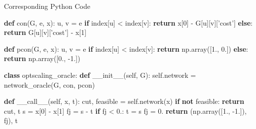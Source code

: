 \documentclass[10pt,ignorenonframetext,serif,onlymath]{beamer}
\newenvironment{Shaded}{}{}
\newcommand{\ControlFlowTok}[1]{\textcolor[rgb]{0.00,0.44,0.13}{\textbf{#1}}}
\newcommand{\DecValTok}[1]{\textcolor[rgb]{0.25,0.63,0.44}{#1}}
\newcommand{\FloatTok}[1]{\textcolor[rgb]{0.25,0.63,0.44}{#1}}
\newcommand{\FunctionTok}[1]{\textcolor[rgb]{0.02,0.16,0.49}{#1}}
\newcommand{\KeywordTok}[1]{\textcolor[rgb]{0.00,0.44,0.13}{\textbf{#1}}}
\newcommand{\NormalTok}[1]{#1}
\newcommand{\OperatorTok}[1]{\textcolor[rgb]{0.40,0.40,0.40}{#1}}
\newcommand{\StringTok}[1]{\textcolor[rgb]{0.25,0.44,0.63}{#1}}
\newcommand{\VariableTok}[1]{\textcolor[rgb]{0.10,0.09,0.49}{#1}}
\begin{document}
\begin{frame}[fragile]{Corresponding Python Code}
\protect\hypertarget{corresponding-python-code-3}{}

\scriptsize

\begin{Shaded}
\begin{Highlighting}[]
\KeywordTok{def}\NormalTok{ con(G, e, x):}
\NormalTok{    u, v }\OperatorTok{=}\NormalTok{ e}
    \ControlFlowTok{if}\NormalTok{ index[u] }\OperatorTok{<}\NormalTok{ index[v]: }\ControlFlowTok{return}\NormalTok{ x[}\DecValTok{0}\NormalTok{] }\OperatorTok{-}\NormalTok{ G[u][v][}\StringTok{'cost'}\NormalTok{]}
    \ControlFlowTok{else}\NormalTok{: }\ControlFlowTok{return}\NormalTok{ G[u][v][}\StringTok{'cost'}\NormalTok{] }\OperatorTok{-}\NormalTok{ x[}\DecValTok{1}\NormalTok{]}

\KeywordTok{def}\NormalTok{ pcon(G, e, x):}
\NormalTok{    u, v }\OperatorTok{=}\NormalTok{ e}
    \ControlFlowTok{if}\NormalTok{ index[u] }\OperatorTok{<}\NormalTok{ index[v]: }\ControlFlowTok{return}\NormalTok{ np.array([}\FloatTok{1.}\NormalTok{, }\FloatTok{0.}\NormalTok{])}
    \ControlFlowTok{else}\NormalTok{: }\ControlFlowTok{return}\NormalTok{ np.array([}\FloatTok{0.}\NormalTok{, }\FloatTok{-1.}\NormalTok{])}

\KeywordTok{class}\NormalTok{ optscaling_oracle:}
    \KeywordTok{def} \FunctionTok{__init__}\NormalTok{(}\VariableTok{self}\NormalTok{, G):}
        \VariableTok{self}\NormalTok{.network }\OperatorTok{=}\NormalTok{ network_oracle(G, con, pcon)}

    \KeywordTok{def} \FunctionTok{__call__}\NormalTok{(}\VariableTok{self}\NormalTok{, x, t):}
\NormalTok{        cut, feasible }\OperatorTok{=} \VariableTok{self}\NormalTok{.network(x)}
        \ControlFlowTok{if} \KeywordTok{not}\NormalTok{ feasible: }\ControlFlowTok{return}\NormalTok{ cut, t}
\NormalTok{        s }\OperatorTok{=}\NormalTok{ x[}\DecValTok{0}\NormalTok{] }\OperatorTok{-}\NormalTok{ x[}\DecValTok{1}\NormalTok{]}
\NormalTok{        fj }\OperatorTok{=}\NormalTok{ s }\OperatorTok{-}\NormalTok{ t}
        \ControlFlowTok{if}\NormalTok{ fj }\OperatorTok{<} \FloatTok{0.}\NormalTok{:}
\NormalTok{            t }\OperatorTok{=}\NormalTok{ s}
\NormalTok{            fj }\OperatorTok{=} \FloatTok{0.}
        \ControlFlowTok{return}\NormalTok{ (np.array([}\FloatTok{1.}\NormalTok{, }\FloatTok{-1.}\NormalTok{]), fj), t}
\end{Highlighting}
\end{Shaded}

\end{frame}
\end{document}
